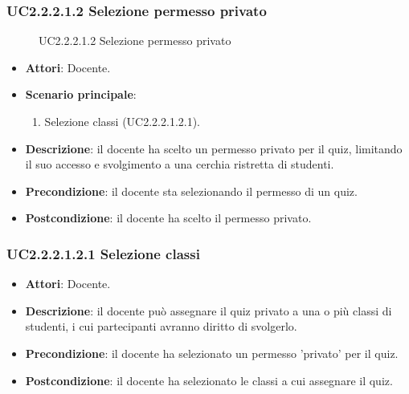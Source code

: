 \subsubsection{UC2.2.2.1.2 Selezione permesso privato}
\begin{figure}[H]
\centering
\noindent{}
\caption{UC2.2.2.1.2 Selezione permesso privato}
\end{figure}
\begin{itemize}
\item \textbf{Attori}: Docente.
\item \textbf{Scenario principale}:
\begin{enumerate}
\item Selezione classi (UC2.2.2.1.2.1).
\end{enumerate}
\item \textbf{Descrizione}: il docente ha scelto un permesso privato per il quiz, limitando il suo accesso e svolgimento a una cerchia ristretta di studenti.
\item \textbf{Precondizione}: il docente sta selezionando il permesso di un quiz.
\item \textbf{Postcondizione}: il docente ha scelto il permesso privato.
\end{itemize}
\subsubsection{UC2.2.2.1.2.1 Selezione classi}
\begin{itemize}
\item \textbf{Attori}: Docente.
\item \textbf{Descrizione}: il docente può assegnare il quiz privato a una o più classi di studenti, i cui partecipanti avranno diritto di svolgerlo.
\item \textbf{Precondizione}: il docente ha selezionato un permesso 'privato' per il quiz.
\item \textbf{Postcondizione}: il docente ha selezionato le classi a cui assegnare il quiz.
\end{itemize}
